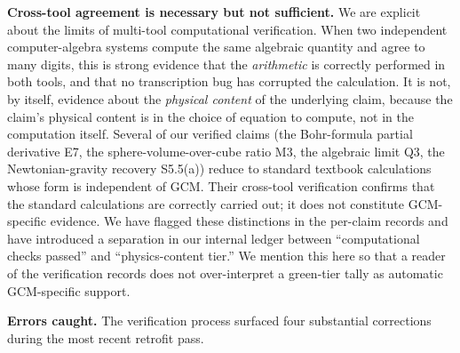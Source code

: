 \documentclass[12pt]{article}
\theoremstyle{definition}
\theoremstyle{remark}
\begin{document}
\textbf{Cross-tool agreement is necessary but not sufficient.} We are
explicit about the limits of multi-tool computational verification. When
two independent computer-algebra systems compute the same algebraic
quantity and agree to many digits, this is strong evidence that the
\emph{arithmetic} is correctly performed in both tools, and that no
transcription bug has corrupted the calculation. It is not, by itself,
evidence about the \emph{physical content} of the underlying claim,
because the claim's physical content is in the choice of equation to
compute, not in the computation itself. Several of our verified claims
(the Bohr-formula partial derivative E7, the sphere-volume-over-cube
ratio M3, the algebraic limit Q3, the Newtonian-gravity recovery
S5.5(a)) reduce to standard textbook calculations whose form is
independent of GCM. Their cross-tool verification confirms that the
standard calculations are correctly carried out; it does not constitute
GCM-specific evidence. We have flagged these distinctions in the
per-claim records and have introduced a separation in our internal
ledger between ``computational checks passed'' and ``physics-content
tier.'' We mention this here so that a reader of the verification
records does not over-interpret a green-tier tally as automatic
GCM-specific support.

\textbf{Errors caught.} The verification process surfaced four
substantial corrections during the most recent retrofit pass.
\end{document}
